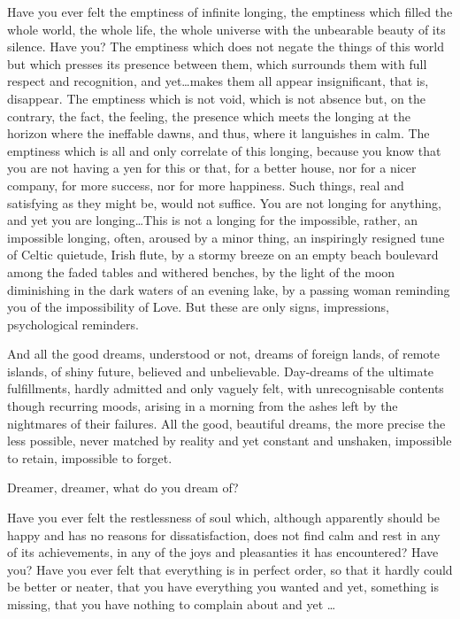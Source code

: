 \pa
Have you ever felt the emptiness of infinite longing, the emptiness which filled
the whole world, the whole life, the whole universe with the unbearable beauty
of its silence.  Have you?  The emptiness which does not negate the things of
this world but which presses its presence between them, which surrounds them
with full respect and recognition, and yet\ldots makes them all appear
insignificant, that is, disappear.  The emptiness which is not void, which is
not absence but, on the contrary, the fact, the feeling, the presence which
meets the longing at the horizon where the ineffable dawns, and thus, where it
languishes in calm.  The emptiness which is all and only correlate of this
longing, because you know that you are not having a yen for this or that, for a
better house, nor for a nicer company, for more success, nor for more happiness.
Such things, real and satisfying as they might be, would not suffice.  You are
not longing for anything, and yet you are longing\ldots This is not a longing
for the impossible, rather, an impossible longing, often, aroused by a minor
thing, an inspiringly resigned tune of Celtic quietude, Irish flute, by a stormy
breeze on an empty beach boulevard among the faded tables and withered benches,
by the light of the moon diminishing in the dark waters of an evening lake, by a
passing woman reminding you of the impossibility of Love.  But these are only
signs, impressions, psychological reminders.

\pa
And all the good dreams, understood or not, dreams of foreign lands, of
remote islands, of shiny future, believed and unbelievable. Day-dreams of the
ultimate fulfillments, hardly admitted and only vaguely felt, with
unrecognisable contents though recurring moods, arising in a morning from the
ashes left by the nightmares of their failures.  All the good, beautiful dreams,
the more precise the less possible, never matched by reality and yet constant
and unshaken, impossible to retain, impossible to forget.

Dreamer, dreamer, what do you dream of?

\pa Have you ever felt the restlessness
of soul which, although apparently should be happy and has no reasons
for dissatisfaction, does not find calm and rest in any of its
achievements, in any of the joys and pleasanties it has encountered? 
Have you?  Have you ever felt that everything is in perfect order, so
that it hardly could be better or neater, that you have everything
you wanted and yet, something is missing, that you have nothing to
complain about and yet \ldots


